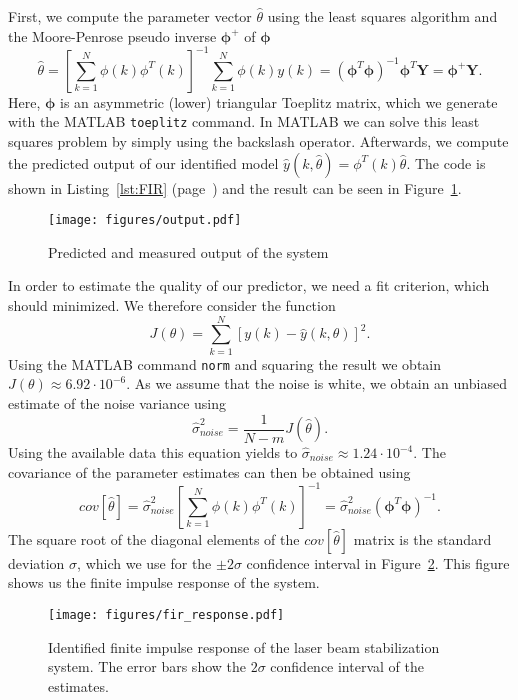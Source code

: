 First, we compute the parameter vector $\hat{\theta}$ using the least squares algorithm and the Moore-Penrose pseudo inverse $\pmb{\phi}^+$ of $\pmb{\phi}$
\begin{equation}\label{eq:FIRmodel}
	\hat{\theta} = \left[ \sum\limits_{k=1}^N \phi(k)\phi^T(k) \right]^{-1} \sum\limits_{k=1}^N 
\phi(k) y(k) = \left( \pmb{\phi}^T \pmb{\phi} \right)^{-1} \pmb{\phi}^T \textbf{Y} = \pmb{\phi}^+ \textbf{Y}.
\end{equation}
Here, $\pmb{\phi}$ is an asymmetric (lower) triangular Toeplitz matrix, which we generate with the MATLAB \texttt{toeplitz} command.
In MATLAB we can solve this least squares problem by simply using the backslash operator. 
Afterwards, we compute the predicted output of our identified model $\hat{y} (k,\hat{\theta}) = \phi^{T} (k) \hat{\theta}$. 
The code is shown in Listing~\ref{lst:FIR} (page~\pageref{lst:FIR}) and the result can be seen in Figure~\ref{fig:output_fir}.
\begin{figure}[h]
	\centering
	\texttt{[image: figures/output.pdf]}
	\caption{Predicted and measured output of the system}\label{fig:output_fir}
\end{figure}
In order to estimate the quality of our predictor, we need a fit criterion, which should minimized. We therefore consider the function
\begin{equation}\label{eq:J}
	J(\theta) = \sum\limits_{k=1}^N \left[y(k) - \hat{y}(k,\theta) \right]^2.
\end{equation}
Using the MATLAB command \texttt{norm} and squaring the result we obtain $ J(\theta) \approx 6.92 \cdot 10^{-6}$. 
As we assume that the noise is white, we obtain an unbiased estimate of the noise variance using
\begin{equation}\label{eq:sigma}
	\hat{\sigma}_{noise}^{2} = \frac{1}{N-m} J(\hat{\theta}) .
\end{equation}
Using the available data this equation yields to $ \hat{\sigma}_{noise} \approx 1.24 \cdot 10^{-4} $.
The covariance of the parameter estimates can then be obtained using
\begin{equation}\label{eq:cov}
	cov[\hat{\theta}] = \hat{\sigma}_{noise}^2 \left[ \sum\limits_{k=1}^N \phi(k)\phi^T(k) \right]^{-1} = \hat{\sigma}_{noise}^2 \left( \pmb{\phi}^T \pmb{\phi} \right)^{-1} .
\end{equation}
The square root of the diagonal elements of the $cov[\hat{\theta}]$ matrix is the standard deviation $ \sigma $, which we use for the $ \pm 2 \sigma $ confidence interval in Figure~\ref{fig:fir_response}. This figure shows us the finite impulse response of the system.
\begin{figure}[h]
	\centering
	\texttt{[image: figures/fir\_response.pdf]}
	\caption{Identified finite impulse response of the laser beam stabilization system. The error bars show the $2\sigma$ confidence interval of the estimates.}\label{fig:fir_response}
\end{figure}

